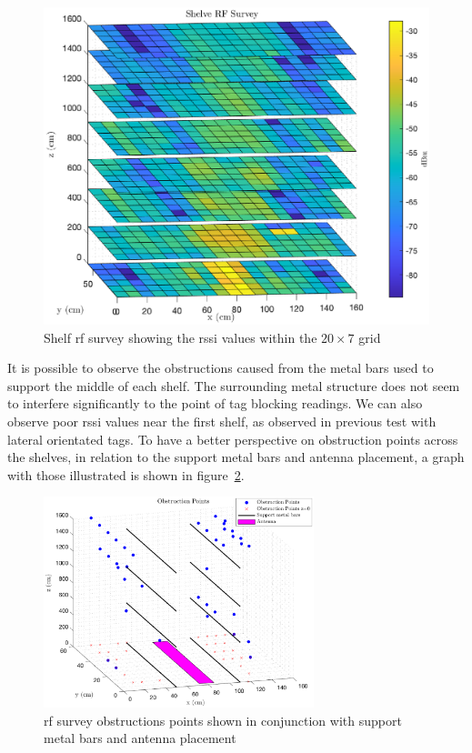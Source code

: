\begin{figure}
    \centering
    \includegraphics[width=0.7\linewidth]{./figs/tests/rfsurvey.eps}
    \caption{Shelf \acs{rf} survey showing the \ac{rssi} values within the $20\times7$ grid}
    \label{fig:rfsurvey}
\end{figure}

It is possible to observe the obstructions caused from the metal bars used to support the middle of each shelf. The surrounding metal structure does not seem to interfere significantly to the point of tag blocking readings. We can also observe poor \ac{rssi} values near the first shelf, as observed in previous test with lateral orientated tags.
To have a better perspective on obstruction points across the shelves, in relation to the support metal bars and antenna placement, a graph with those illustrated is shown in figure~\ref{fig:shelveobstructions}. 

\begin{figure}
    \centering
    \includegraphics[width=0.7\textwidth]{figs/tests/obstructions.eps}
    \caption{\acs{rf} survey obstructions points shown in conjunction with support metal bars and antenna placement}
    \label{fig:shelveobstructions}
\end{figure}

